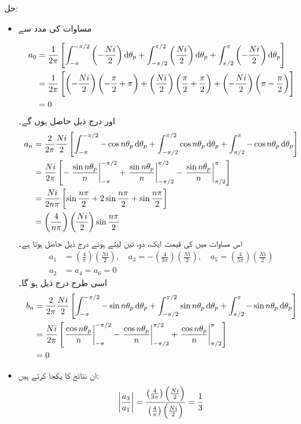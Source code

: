 حل:
\begin{itemize}
\item
مساوات   کی مدد سے

\begin{align*}
a_0&=\frac{1}{2\pi} \left[\int_{-\pi}^{-\pi/2} \left(-\frac{Ni}{2} \right) \dif \theta_p+\int_{-\pi/2}^{\pi/2} \left (\frac{Ni}{2}\right) \dif \theta_p +\int_{\pi/2}^{\pi} \left(-\frac{Ni}{2}\right) \dif \theta_p  \right]\\
&=\frac{1}{2\pi} \left[\left(-\frac{Ni}{2} \right)\left(-\frac{\pi}{2}+\pi \right) +\left(\frac{Ni}{2} \right)\left(\frac{\pi}{2}+\frac{\pi}{2} \right)+\left(-\frac{Ni}{2} \right)\left(\pi-\frac{\pi}{2} \right)\right]\\
&=0
\end{align*}
اور درج ذیل حاصل ہوں گے۔
\begin{align*}
a_n&=\frac{2}{2\pi} \frac{Ni}{2} \left[\int_{-\pi}^{-\pi/2} -\cos n \theta_p \dif \theta_p +\int_{-\pi/2}^{\pi/2} \cos n \theta_p \dif \theta_p+\int_{\pi/2}^{\pi} -\cos n \theta_p \dif \theta_p\right]\\
&=\frac{Ni}{2\pi} \left[-\left. \frac{\sin n \theta_p}{n}\right|_{-\pi}^{-\pi/2} +\left. \frac{\sin n \theta_p}{n}\right|_{-\pi/2}^{\pi/2} -\left. \frac{\sin n \theta_p}{n}\right|_{\pi/2}^{\pi} \right]\\
&=\frac{Ni}{2n\pi} \left[\sin \frac{n\pi}{2}+2\sin \frac{n\pi}{2}+\sin \frac{n\pi}{2} \right]\\
&=\left(\frac{4}{n\pi}\right) \left( \frac{Ni}{2}\right) \sin \frac{n\pi}{2}
\end{align*}
اس مساوات میں  کی قیمت ایک، دو، تین لیتے ہوئے درج ذیل حاصل ہوتا ہے۔
\begin{align*}
a_1&=\left(\frac{4}{\pi}\right) \left( \frac{Ni}{2}\right), \quad a_3=-\left(\frac{4}{3\pi}\right) \left( \frac{Ni}{2}\right), \quad a_5=\left(\frac{4}{5\pi}\right) \left( \frac{Ni}{2}\right)\\
a_2&=a_4=a_6=0
\end{align*}
اسی طرح درج ذیل ہو گا۔
\begin{align*}
b_n&=\frac{2}{2\pi} \frac{Ni}{2} \left[\int_{-\pi}^{-\pi/2} -\sin n \theta_p \dif \theta_p +\int_{-\pi/2}^{\pi/2} \sin n \theta_p \dif \theta_p+\int_{\pi/2}^{\pi} -\sin n \theta_p \dif \theta_p\right]\\
&=\frac{Ni}{2\pi} \left[\left. \frac{\cos n \theta_p}{n}\right|_{-\pi}^{-\pi/2} -\left. \frac{\cos n \theta_p}{n}\right|_{-\pi/2}^{\pi/2} +\left. \frac{\cos n \theta_p}{n}\right|_{\pi/2}^{\pi} \right]\\
&=0
\end{align*}
\item
ان نتائج کا یکجا کرتے ہیں:
\begin{align*}
\abs{\frac{a_3}{a_1}} =\frac{\left(\frac{4}{3\pi}\right) \left( \frac{Ni}{2}\right)}{\left(\frac{4}{\pi}\right) \left( \frac{Ni}{2}\right)}=\frac{1}{3}
\end{align*}
\end{itemize}
